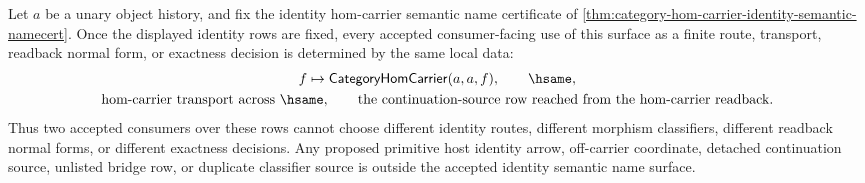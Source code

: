 \begin{corollary}
\label{cor:category-hom-identity-semantic-namecert-consumer-determinacy}
Let $a$ be a unary object history, and fix the identity hom-carrier semantic
name certificate of \autoref{thm:category-hom-carrier-identity-semantic-namecert}.
Once the displayed identity rows are fixed, every accepted consumer-facing use
of this surface as a finite route, transport, readback normal form, or exactness
decision is determined by the same local data:
$$
\begin{gathered}
f\mapsto\mathsf{CategoryHomCarrier}(a,a,f),\qquad
\hsame,\\
\text{hom-carrier transport across }\hsame,\qquad
\text{the continuation-source row reached from the hom-carrier readback.}
\end{gathered}
$$
Thus two accepted consumers over these rows cannot choose different identity
routes, different morphism classifiers, different readback normal forms, or
different exactness decisions. Any proposed primitive host identity arrow,
off-carrier coordinate, detached continuation source, unlisted bridge row, or
duplicate classifier source is outside the accepted identity semantic name
surface.
\end{corollary}
